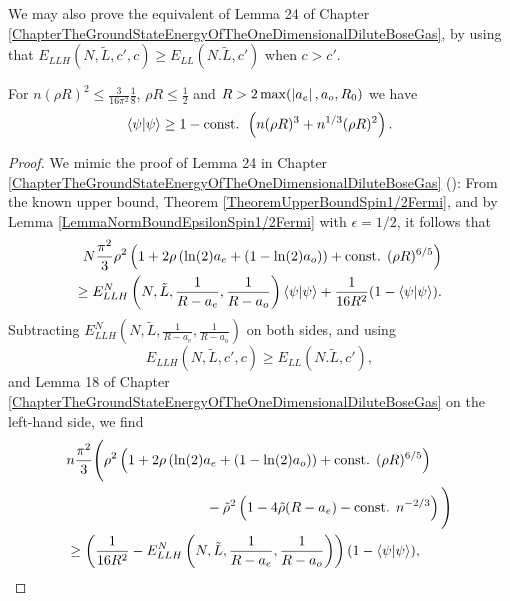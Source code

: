 We may also prove the equivalent of Lemma 24 of Chapter \ref{ChapterTheGroundStateEnergyOfTheOneDimensionalDiluteBoseGas}, by using that $ E_{LLH}(N,\tilde{L},c',c)\geq E_{LL}(N.\tilde{L},c') $ when $ c>c' $.
	\begin{lemma}\label{LemmaImprovedMassBoundSpin1/2Fermi}
	For $ n(\rho R)^2\leq  \frac{3}{16\pi^2}\frac{1}{8} $, $ \rho R\leq \frac{1}{2} $ and $ R>2\max(\left\lvert a_e \right\rvert,a_o,R_0) $ we have
	\begin{equation}\label{EqImprovedMassBoundSpin1/2Fermi}
	\begin{aligned}
	\left\langle\psi|\psi\right\rangle \geq 1-\textnormal{const. }\left(n(\rho R)^3+n^{1/3}(\rho R)^2\right).
	\end{aligned}
	\end{equation}
\end{lemma}
\begin{proof}
	We mimic the proof of Lemma 24 in Chapter \ref{ChapterTheGroundStateEnergyOfTheOneDimensionalDiluteBoseGas} (\cite{agerskov2022ground}): From the known upper bound, \ie Theorem \ref{TheoremUpperBoundSpin1/2Fermi}, and by Lemma \ref{LemmaNormBoundEpsilonSpin1/2Fermi} with $ \epsilon=1/2 $, it follows that 
    \begin{equation}
    \begin{aligned}
    N\frac{\pi^2}{3}\rho^2\left(1+2\rho\left( \ln(2)a_e+(1-\ln(2)a_o) \right)+\text{const. }(\rho R)^{6/5}\right)\\\geq E_{LLH}^N \left(N,\tilde{L},\frac{1}{R-a_e},\frac{1}{R-a_o}\right)\left\langle\psi|\psi\right\rangle+ \frac{1}{16R^2}(1-\left\langle\psi|\psi\right\rangle).
    \end{aligned}
    \end{equation}
	Subtracting $ E_{LLH}^N \left(N,\tilde{L},\frac{1}{R-a_e},\frac{1}{R-a_o}\right) $ on both sides, and using $$ E_{LLH}(N,\tilde{L},c',c)\geq E_{LL}(N.\tilde{L},c'), $$ and Lemma 18 of Chapter \ref{ChapterTheGroundStateEnergyOfTheOneDimensionalDiluteBoseGas} on the left-hand side, we find\begin{equation}
	\begin{aligned}
	&n\frac{\pi^2}{3}\Bigg(\rho^2\left(1+2\rho\left( \ln(2)a_e+(1-\ln(2)a_o) \right)+\text{const. }(\rho R)^{6/5}\right)\\&\qquad \qquad\qquad\qquad\qquad-\tilde{\rho}^2\left(1-4\tilde{\rho} (R-a_e)-\text{const. }n^{-2/3}\right)\Bigg)\\
	&\geq  \left(\frac{1}{16R^2}-E_{LLH}^N \left(N,\tilde{L},\frac{1}{R-a_e},\frac{1}{R-a_o}\right)\right)(1-\braket{\psi|\psi}),
	\end{aligned}

\end{equation}
\end{proof}
